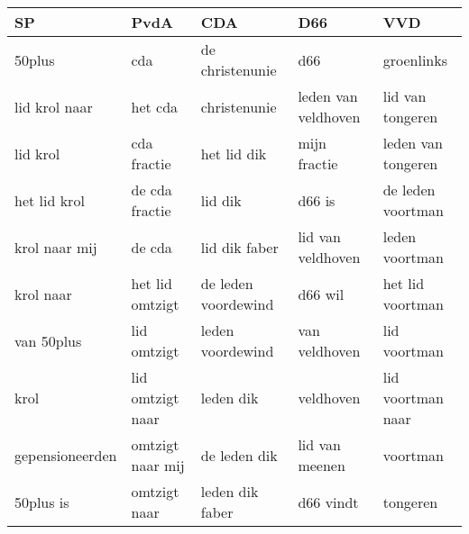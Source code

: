 \begin{tabular}{lllll}
\toprule
              SP &              PvdA &                  CDA &                  D66 &                 VVD \\
\midrule
          50plus &               cda &      de christenunie &                  d66 &          groenlinks \\
   lid krol naar &           het cda &         christenunie &  leden van veldhoven &    lid van tongeren \\
        lid krol &       cda fractie &          het lid dik &         mijn fractie &  leden van tongeren \\
    het lid krol &    de cda fractie &              lid dik &               d66 is &   de leden voortman \\
   krol naar mij &            de cda &        lid dik faber &    lid van veldhoven &      leden voortman \\
       krol naar &   het lid omtzigt &  de leden voordewind &              d66 wil &    het lid voortman \\
      van 50plus &       lid omtzigt &     leden voordewind &        van veldhoven &        lid voortman \\
            krol &  lid omtzigt naar &            leden dik &            veldhoven &   lid voortman naar \\
 gepensioneerden &  omtzigt naar mij &         de leden dik &       lid van meenen &            voortman \\
       50plus is &      omtzigt naar &      leden dik faber &            d66 vindt &            tongeren \\
\bottomrule
\end{tabular}
